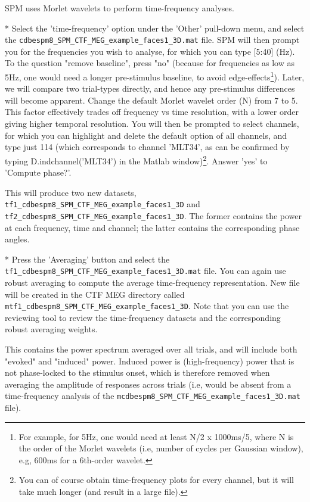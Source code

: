 SPM uses Morlet wavelets to perform time-frequency analyses.

* Select the 'time-frequency' option under the 'Other' pull-down menu, and select the \verb!cdbespm8_SPM_CTF_MEG_example_faces1_3D.mat! file. SPM will then prompt you for the frequencies you wish to analyse, for which you can type [5:40] (Hz). To the question "remove baseline", press "no" (because for frequencies as low as 5Hz, one would need a longer pre-stimulus baseline, to avoid edge-effects\footnote{For example, for 5Hz, one would need at least N/2 x 1000ms/5, where N is the order of the Morlet wavelets (i.e, number of cycles per Gaussian window), e.g, 600ms for a 6th-order wavelet.}). Later, we will compare two trial-types directly, and hence any pre-stimulus differences will become apparent. Change the default Morlet wavelet order (N) from 7 to 5. This factor effectively trades off frequency vs time resolution, with a lower order giving higher temporal resolution. You will then be prompted to select channels, for which you can highlight and delete the default option of all channels, and type just 114 (which corresponds to channel 'MLT34', as can be confirmed by typing D.indchannel('MLT34') in the Matlab window)\footnote{You can of course obtain time-frequency plots for every channel, but it will take much longer (and result in a large file).}. Answer 'yes' to 'Compute phase?'.

This will produce two new datasets, \verb!tf1_cdbespm8_SPM_CTF_MEG_example_faces1_3D! and  \verb!tf2_cdbespm8_SPM_CTF_MEG_example_faces1_3D!. The former contains the power at each frequency, time and channel; the latter contains the corresponding phase angles.

* Press the 'Averaging' button and select the \verb!tf1_cdbespm8_SPM_CTF_MEG_example_faces1_3D.mat! file. You can again use robust averaging to compute the average time-frequency representation.
New file will be created in the CTF MEG directory called \verb!mtf1_cdbespm8_SPM_CTF_MEG_example_faces1_3D!. Note that you can use the reviewing tool to review the time-frequency datasets and the corresponding robust averaging weights.

This contains the power spectrum averaged over all trials, and will include both "evoked" and "induced" power. Induced power is (high-frequency) power that is not phase-locked to the stimulus onset, which is therefore removed when averaging the amplitude of responses across trials (i.e, would be absent from a time-frequency analysis of the \verb!mcdbespm8_SPM_CTF_MEG_example_faces1_3D.mat! file).

